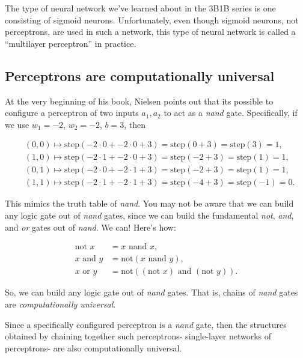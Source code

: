 \documentclass{article}
\begin{document}
	The type of neural network we've learned about in the 3B1B series is one consisting of sigmoid neurons. Unfortunately, even though sigmoid neurons, not perceptrons, are used in such a network, this type of neural network is called a ``multilayer perceptron'' in practice.
	
	\subsection*{Perceptrons are computationally universal}
	
	At the very beginning of his book, Nielsen points out that its possible to configure a perceptron of two inputs $a_1, a_2$ to act as a \textit{nand} gate. Specifically, if we use $w_1 = -2$, $w_2 = -2$, $b = 3$, then
	
	\begin{align*}
		&(0, 0) \mapsto \text{step}(-2 \cdot 0 + -2 \cdot 0 + 3) = \text{step}(0 + 3) = \text{step}(3) = 1, \\
		&(1, 0) \mapsto \text{step}(-2 \cdot 1 + -2 \cdot 0 + 3) = \text{step}(-2 + 3) = \text{step}(1) = 1, \\
		&(0, 1) \mapsto \text{step}(-2 \cdot 0 + -2 \cdot 1 + 3) = \text{step}(-2 + 3) = \text{step}(1) = 1, \\
		&(1, 1) \mapsto \text{step}(-2 \cdot 1 + -2 \cdot 1 + 3) = \text{step}(-4 + 3) = \text{step}(-1) = 0.
	\end{align*}
	
	This mimics the truth table of \textit{nand}. You may not be aware that we can build any logic gate out of \textit{nand} gates, since we can build the fundamental \textit{not}, \textit{and}, and \textit{or} gates out of \textit{nand}. We can! Here's how:
	
	\begin{align*}
		\text{not } x &= x \text{ nand } x, \\
		x \text{ and } y &= \text{not}(x \text{ nand } y), \\
		x \text{ or } y &= \text{not}((\text{not } x) \text{ and } (\text{not } y)).
	\end{align*}
	
	So, we can build any logic gate out of \textit{nand} gates. That is, chains of \textit{nand} gates are \textit{computationally universal}. 
	
	Since a specifically configured perceptron is a \textit{nand} gate, then the structures obtained by chaining together such perceptrons- single-layer networks of perceptrons- are also computationally universal.
	
\end{document}
